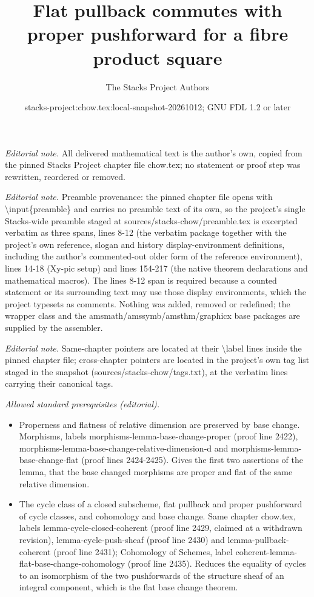 \documentclass[10pt,a4paper]{amsart}
\title{Flat pullback commutes with proper pushforward for a fibre product square}
\author{The Stacks Project Authors}
\date{stacks-project:chow.tex:local-snapshot-20261012; GNU FDL 1.2 or later}
\theoremstyle{plain}
\theoremstyle{definition}
\theoremstyle{remark}
\numberwithin{equation}{subsection}
\begin{document}
\maketitle
\noindent\textit{Editorial note.} All delivered mathematical text is the author's own, copied from the pinned Stacks Project chapter file chow.tex; no statement or proof step was rewritten, reordered or removed.\par\medskip
\noindent\textit{Editorial note.} Preamble provenance: the pinned chapter file opens with \textbackslash{}input\{preamble\} and carries no preamble text of its own, so the project's single Stacks-wide preamble staged at sources/stacks-chow/preamble.tex is excerpted verbatim as three spans, lines 8-12 (the verbatim package together with the project's own reference, slogan and history display-environment definitions, including the author's commented-out older form of the reference environment), lines 14-18 (Xy-pic setup) and lines 154-217 (the native theorem declarations and mathematical macros). The lines 8-12 span is required because a counted statement or its surrounding text may use those display environments, which the project typesets as comments. Nothing was added, removed or redefined; the wrapper class and the amsmath/amssymb/amsthm/graphicx base packages are supplied by the assembler.\par\medskip
\noindent\textit{Editorial note.} Same-chapter pointers are located at their \textbackslash{}label lines inside the pinned chapter file; cross-chapter pointers are located in the project's own tag list staged in the snapshot (sources/stacks-chow/tags.txt), at the verbatim lines carrying their canonical tags.\par\medskip
\noindent\textit{Allowed standard prerequisites (editorial).}\begin{itemize}
\item Properness and flatness of relative dimension are preserved by base change. Morphisms, labels morphisms-lemma-base-change-proper (proof line 2422), morphisms-lemma-base-change-relative-dimension-d and morphisms-lemma-base-change-flat (proof lines 2424-2425). Gives the first two assertions of the lemma, that the base changed morphisms are proper and flat of the same relative dimension.
\item The cycle class of a closed subscheme, flat pullback and proper pushforward of cycle classes, and cohomology and base change. Same chapter chow.tex, labels lemma-cycle-closed-coherent (proof line 2429, claimed at a withdrawn revision), lemma-cycle-push-sheaf (proof line 2430) and lemma-pullback-coherent (proof line 2431); Cohomology of Schemes, label coherent-lemma-flat-base-change-cohomology (proof line 2435). Reduces the equality of cycles to an isomorphism of the two pushforwards of the structure sheaf of an integral component, which is the flat base change theorem.
\end{itemize}\medskip
\end{document}
